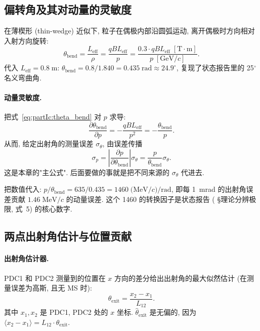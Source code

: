 \subsection{偏转角及其对动量的灵敏度}

在薄楔形 (thin-wedge) 近似下, 粒子在偶极内部沿圆弧运动, 离开偶极时方向相对入射方向旋转:
\begin{equation}
  \theta_\mathrm{bend} = \frac{L_\mathrm{eff}}{\rho}
  = \frac{q B L_\mathrm{eff}}{p}
  = \frac{0.3 \cdot q B L_\mathrm{eff}\;[\mathrm{T \cdot m}]}{p\;[\mathrm{GeV}/c]}.
  \label{eq:partIc:theta_bend}
\end{equation}
代入 $L_\mathrm{eff} = 0.8\;\mathrm{m}$: $\theta_\mathrm{bend} = 0.8 / 1.840 = 0.435\;\mathrm{rad} \approx 24.9^\circ$, 复现了状态报告里的 25$^\circ$ 名义弯曲角.

\paragraph{动量灵敏度.} 把式~\eqref{eq:partIc:theta_bend} 对 $p$ 求导:
\begin{equation}
  \frac{\partial \theta_\mathrm{bend}}{\partial p}
  = -\frac{q B L_\mathrm{eff}}{p^2}
  = -\frac{\theta_\mathrm{bend}}{p}.
  \label{eq:partIc:dtheta_dp}
\end{equation}
从而, 给定出射角的测量误差 $\sigma_\theta$, 由误差传播
\begin{equation}
  \sigma_p = \left|\frac{\partial p}{\partial \theta_\mathrm{bend}}\right| \sigma_\theta
  = \frac{p}{\theta_\mathrm{bend}} \sigma_\theta.
  \label{eq:partIc:sigma_p_master}
\end{equation}
这是本章的"主公式". 后面要做的事就是把不同来源的 $\sigma_\theta$ 代进去.

把数值代入: $p / \theta_\mathrm{bend} = 635 / 0.435 = 1460\;\mathrm{(MeV}/c\mathrm{)/rad}$, 即每 1~mrad 的出射角误差贡献 $1.46\;\mathrm{MeV}/c$ 的动量误差. 这个 1460 的转换因子是状态报告 (\StatusReport{} §理论分辨极限, 式~5) 的核心数字.

\subsection{两点出射角估计与位置贡献}

\paragraph{出射角估计器.} PDC1 和 PDC2 测量到的位置在 $x$ 方向的差分给出出射角的最大似然估计 (在测量误差为高斯, 且无 MS 时):
\begin{equation}
  \widehat\theta_\mathrm{exit} = \frac{x_2 - x_1}{L_{12}}.
  \label{eq:partIc:theta_exit_est}
\end{equation}
其中 $x_1, x_2$ 是 PDC1, PDC2 处的 $x$ 坐标. $\widehat\theta_\mathrm{exit}$ 是无偏的, 因为 $\langle x_2 - x_1 \rangle = L_{12} \cdot \theta_\mathrm{exit}$.

